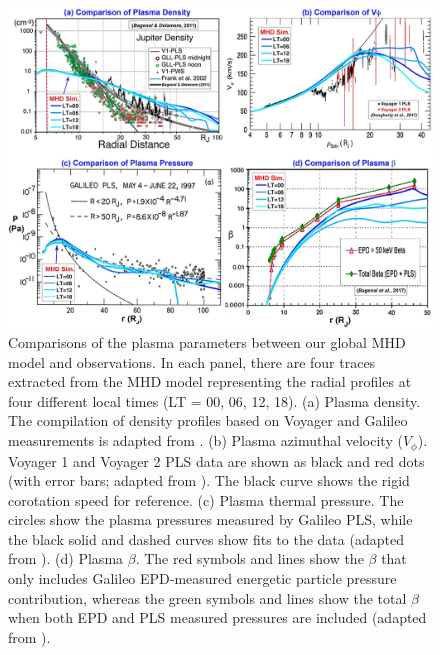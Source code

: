 \begin{figure}
    \centering
    \includegraphics[width=\textwidth]{images2/comparison-plasma.jpg}
    \caption{Comparisons of the plasma parameters between our global MHD model and observations. In each panel, there are four traces extracted from the MHD model representing the radial profiles at four different local times (LT = 00, 06, 12, 18). (a) Plasma density. The compilation of density profiles based on Voyager and Galileo measurements is adapted from \protect{}. (b) Plasma azimuthal velocity ($V_\phi$). Voyager 1 and Voyager 2 PLS data are shown as black and red dots (with error bars; adapted from \protect{}). The black curve shows the rigid corotation speed for reference. (c) Plasma thermal pressure. The circles show the plasma pressures measured by Galileo PLS, while the black solid and dashed curves show fits to the data (adapted from \protect{}). (d) Plasma $\beta$. The red symbols and lines show the $\beta$ that only includes Galileo EPD‐measured energetic particle pressure contribution, whereas the green symbols and lines show the total $\beta$ when both EPD and PLS measured pressures are included (adapted from \protect{}).}
    \label{fig:comparison-plasma}
\end{figure}

